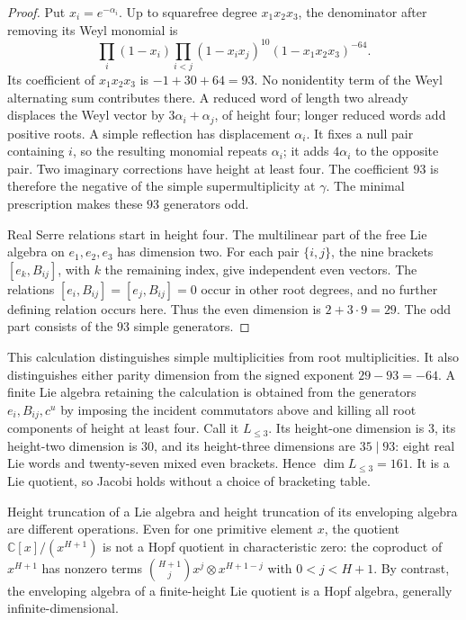 \begin{proof}
Put $x_i=e^{-\alpha_i}$. Up to squarefree degree
$x_1x_2x_3$, the denominator after removing its Weyl monomial is
\[
 \prod_i(1-x_i)\prod_{i<j}(1-x_ix_j)^{10}
                    (1-x_1x_2x_3)^{-64}.
\]
Its coefficient of $x_1x_2x_3$ is $-1+30+64=93$.
No nonidentity term of the Weyl alternating sum contributes
there. A reduced word of length two already displaces the
Weyl vector by $3\alpha_i+\alpha_j$, of height four;
longer reduced words add positive roots. A simple reflection
has displacement $\alpha_i$. It fixes a null pair containing
$i$, so the resulting monomial repeats $\alpha_i$; it adds
$4\alpha_i$ to the opposite pair. Two imaginary corrections
have height at least four. The coefficient $93$ is therefore
the negative of the simple supermultiplicity at $\gamma$.
The minimal prescription makes these $93$ generators odd.

Real Serre relations start in height four. The multilinear
part of the free Lie algebra on $e_1,e_2,e_3$ has dimension two.
For each pair $\{i,j\}$, the nine brackets $[e_k,B_{ij}]$,
with $k$ the remaining index, give independent even vectors.
The relations $[e_i,B_{ij}]=[e_j,B_{ij}]=0$ occur in other
root degrees, and no further defining relation occurs here.
Thus the even dimension is $2+3\cdot9=29$. The odd part
consists of the $93$ simple generators.
\end{proof}

This calculation distinguishes simple multiplicities from
root multiplicities. It also distinguishes either parity
dimension from the signed exponent $29-93=-64$.
A finite Lie algebra retaining the calculation is obtained
from the generators $e_i,B_{ij},c^u$ by imposing the incident
commutators above and killing all root components of height
at least four. Call it $L_{\le3}$. Its height-one dimension
is $3$, its height-two dimension is $30$, and its height-three
dimensions are $35\mid93$: eight real Lie words and
twenty-seven mixed even brackets. Hence $\dim L_{\le3}=161$.
It is a Lie quotient, so Jacobi holds without a choice of
bracketing table.

Height truncation of a Lie algebra and height truncation of
its enveloping algebra are different operations. Even for
one primitive element $x$, the quotient $\mathbb C[x]/(x^{H+1})$
is not a Hopf quotient in characteristic zero: the coproduct
of $x^{H+1}$ has nonzero terms
$\binom{H+1}{j}x^j\otimes x^{H+1-j}$ with $0<j<H+1$.
By contrast, the enveloping algebra of a finite-height Lie
quotient is a Hopf algebra, generally infinite-dimensional.

